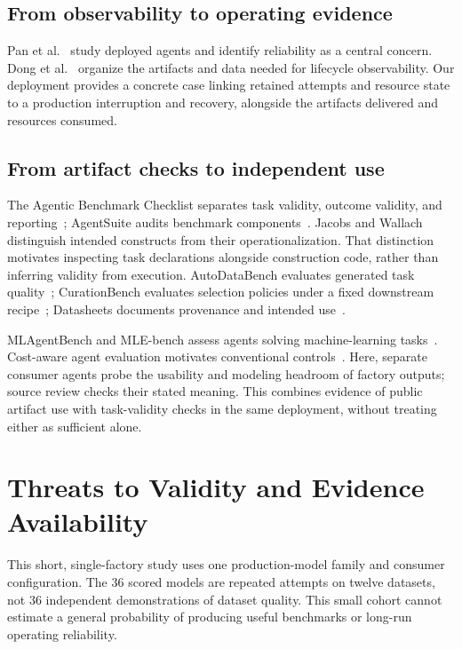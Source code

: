 \documentclass[conference,10pt,letterpaper]{IEEEtran}
\begin{document}
\subsection{From observability to operating evidence}
Pan et al.~\cite{production} study deployed agents and identify reliability as a central concern. Dong et al.~\cite{agentops} organize the artifacts and data needed for lifecycle observability. Our deployment provides a concrete case linking retained attempts and resource state to a production interruption and recovery, alongside the artifacts delivered and resources consumed.

\subsection{From artifact checks to independent use}
The Agentic Benchmark Checklist separates task validity, outcome validity, and reporting~\cite{abc}; AgentSuite audits benchmark components~\cite{agentsuite}. Jacobs and Wallach~\cite{measurement} distinguish intended constructs from their operationalization. That distinction motivates inspecting task declarations alongside construction code, rather than inferring validity from execution. AutoDataBench evaluates generated task quality~\cite{autodatabench}; CurationBench evaluates selection policies under a fixed downstream recipe~\cite{curation}; Datasheets documents provenance and intended use~\cite{datasheets}.

MLAgentBench and MLE-bench assess agents solving machine-learning tasks~\cite{mlagentbench,mlebench}. Cost-aware agent evaluation motivates conventional controls~\cite{agents-matter}. Here, separate consumer agents probe the usability and modeling headroom of factory outputs; source review checks their stated meaning. This combines evidence of public artifact use with task-validity checks in the same deployment, without treating either as sufficient alone.

\section{Threats to Validity and Evidence Availability}
This short, single-factory study uses one production-model family and consumer configuration. The 36 scored models are repeated attempts on twelve datasets, not 36 independent demonstrations of dataset quality. This small cohort cannot estimate a general probability of producing useful benchmarks or long-run operating reliability.
\end{document}

